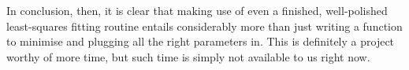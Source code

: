 In conclusion, then, it is clear that making use of even a finished,
well-polished least-squares fitting routine entails considerably more
than just writing a function to minimise and plugging all the right
parameters in.  This is definitely a project worthy of more time, but
such time is simply not available to us right now.


